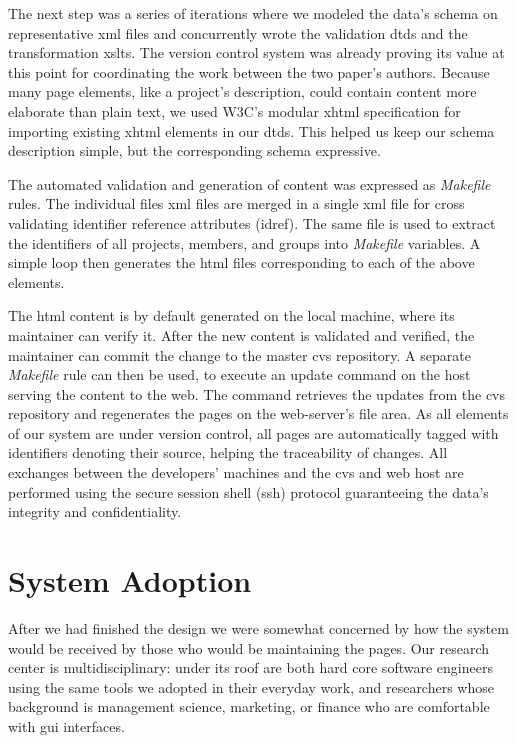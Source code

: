 \documentclass[10pt]{article}
\begin{document}
The next step was a series of iterations where we
modeled the data's schema on representative {\sc xml}
files and concurrently wrote the validation {\sc dtd}s
and the transformation {\sc xslt}s.
The version control system was already proving its value
at this point
for coordinating the work between the two paper's authors.
Because many page elements, like a project's description,
could contain content more elaborate than plain text,
we used W3C's modular {\sc xhtml} specification for
importing existing {\sc xhtml} elements in our {\sc dtd}s.
This helped us keep our schema description simple,
but the corresponding schema expressive.

The automated validation and generation of content was
expressed as {\em Makefile} rules.
The individual files {\sc xml} files are merged in a
single {\sc xml} file for cross validating identifier
reference attributes ({\sc idref}).
The same file is used to extract the identifiers of
all projects, members, and groups into {\em Makefile}
variables.
A simple loop then generates the {\sc html} files
corresponding to each of the above elements.

The {\sc html} content is by default generated on the
local machine, where its maintainer can verify it.
After the new content is validated and verified,
the maintainer can commit the change to the master
{\sc cvs} repository.
A separate {\em Makefile} rule can then be used,
to execute an update command on the
host serving the content to the web.
The command retrieves the updates from the {\sc cvs}
repository and regenerates the pages on the web-server's
file area.
As all elements of our system are under version control,
all pages are automatically tagged with identifiers
denoting their source, helping the traceability of changes.
All exchanges between the developers' machines and the
{\sc cvs} and web host are performed using the secure session
shell ({\sc ssh}) protocol guaranteeing the data's integrity
and confidentiality.

\section{System Adoption}
\label{sec:adopt}
After we had finished the design we were somewhat concerned
by how the system would be received by those who would be
maintaining the pages.
Our research center is multidisciplinary: under its roof
are both hard core software engineers using the same tools
we adopted in their everyday work, and researchers whose
background is management science, marketing, or finance
who are comfortable with {\sc gui} interfaces.
\end{document}
